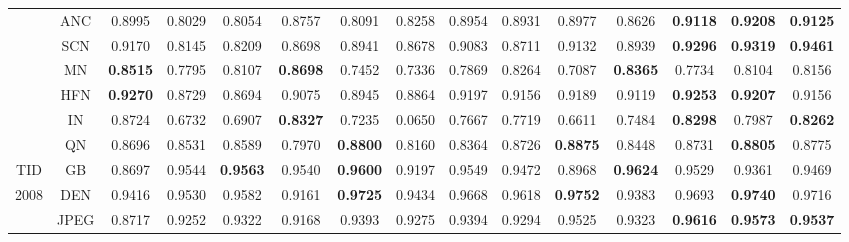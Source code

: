 \begin{table*}[htb]
\begin{tabular}{ccccccccccccccc}
                      & ANC   & 0.8995 & 0.8029          & 0.8054          & 0.8757          & 0.8091          & 0.8258          & 0.8954          & 0.8931          & 0.8977          & 0.8626          & \textbf{0.9118} & \textbf{0.9208} & \textbf{0.9125}                     \\
                      & SCN   & 0.9170 & 0.8145          & 0.8209          & 0.8698          & 0.8941          & 0.8678          & 0.9083          & 0.8711          & 0.9132          & 0.8939          & \textbf{0.9296} & \textbf{0.9319} & \textbf{0.9461}                     \\
                      & MN    & \textbf{0.8515} & 0.7795          & 0.8107          & \textbf{0.8698} & 0.7452          & 0.7336          & 0.7869          & 0.8264          & 0.7087          & \textbf{0.8365} & 0.7734          & 0.8104 & 0.8156                              \\
                      & HFN   & \textbf{0.9270} & 0.8729          & 0.8694          & 0.9075          & 0.8945          & 0.8864          & 0.9197          & 0.9156          & 0.9189          & 0.9119          & \textbf{0.9253} & \textbf{0.9207} & 0.9156                     \\
                      & IN    & 0.8724 & 0.6732          & 0.6907          & \textbf{0.8327} & 0.7235          & 0.0650          & 0.7667          & 0.7719          & 0.6611          & 0.7484          & \textbf{0.8298} & 0.7987 & \textbf{0.8262}                              \\
                      & QN    & 0.8696          & 0.8531          & 0.8589          & 0.7970          & \textbf{0.8800} & 0.8160          & 0.8364          & 0.8726          & \textbf{0.8875} & 0.8448          & 0.8731          & \textbf{0.8805} & 0.8775                     \\
TID                   & GB    & 0.8697          & 0.9544          & \textbf{0.9563}          & 0.9540          & \textbf{0.9600} & 0.9197          & 0.9549          & 0.9472          & 0.8968          & \textbf{0.9624} & 0.9529          & 0.9361 & 0.9469                              \\
2008                  & DEN   & 0.9416          & 0.9530          & 0.9582          & 0.9161          & \textbf{0.9725} & 0.9434          & 0.9668          & 0.9618          & \textbf{0.9752} & 0.9383          & 0.9693          & \textbf{0.9740} & 0.9716                     \\
                      & JPEG  & 0.8717          & 0.9252          & 0.9322          & 0.9168          & 0.9393          & 0.9275          & 0.9394          & 0.9294          & 0.9525 & 0.9323          & \textbf{0.9616} & \textbf{0.9573} & \textbf{0.9537}                     \\

\end{tabular}
\end{table*}

